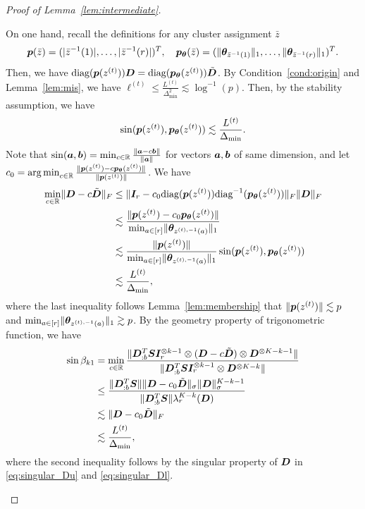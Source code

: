 \documentclass[lettersize,journal]{IEEEtran}
\theoremstyle{definition}
\theoremstyle{definition}
\begin{document}
\begin{proof}[Proof of Lemma~\ref{lem:intermediate}]
\begin{enumerate}
    On one hand, recall the definitions for any cluster assignment $\bar z$
    \begin{equation}
        \bm{p}(\bar z)=(|\bar z^{-1}(1)|, \ldots,|\bar z^{-1}(r)|)^T,\quad \bm{p}_{\boldsymbol{\theta}}(\bar z)=(\lVert\boldsymbol{\theta}_{\bar z^{-1}(1)}\rVert_1,\ldots,\lVert\boldsymbol{\theta}_{\bar z^{-1}(r)}\rVert_1)^T.
    \end{equation}
    Then, we have $\text{diag}(\bm{p}(z^{(t)})) \bm{D} = \text{diag}(\bm{p}_{\boldsymbol{\theta}}(z^{(t)})) \tilde {\bm{D}}$. By Condition~\ref{cond:origin} and Lemma~\ref{lem:mis}, we have $\ell^{(t)} \leq \frac{L^{(t)}}{\Delta_{\min}^2} \lesssim \log^{-1}(p) $. Then, by the stability assumption, we have 
    \begin{equation}
         \sin (\bm{p}(z^{(t)}), \bm{p}_{\boldsymbol{\theta}}(z^{(t)})) \lesssim \frac{L^{(t)}}{\Delta_{\min}}. 
    \end{equation}
    Note that $\sin(\bm{a},\bm{b}) =\min_{c \in \mathbb{R}} \frac{ \lVert\bm{a} - c\bm{b}\rVert }{\lVert\bm{a}\rVert}$ for vectors $\bm{a},\bm{b}$ of same dimension, and let $c_0 = \operatorname*{arg\,min}_{c \in \mathbb{R}} \frac{\lVert\bm{p}(z^{(t)}) - c\bm{p}_{\boldsymbol{\theta}}(z^{(t)})\rVert}{\lVert\bm{p}(z^{(t)})\rVert}$. We have
    \begin{align}
       \min_{c \in \mathbb{R}} \lVert \bm{D} - c \tilde {\bm{D}}\rVert_F &\leq  \lVert \bm I_r - c_0 \text{diag}(\bm{p}(z^{(t)})) \text{diag}^{-1}(\bm{p}_{\boldsymbol{\theta}}(z^{(t)}))\rVert_F \lVert\bm{D}\rVert_F\\
       &\lesssim \frac{ \lVert \bm{p}(z^{(t)}) - c_0\bm{p}_{\boldsymbol{\theta}}(z^{(t)})\rVert }{\min_{a \in [r]} \lVert\boldsymbol{\theta}_{z^{(t),-1}(a)} \rVert_1  } \\
       & \lesssim \frac{\lVert \bm{p}(z^{(t)})\rVert }{\min_{a \in [r]} \lVert\boldsymbol{\theta}_{z^{(t),-1}(a)} \rVert_1 } \sin (\bm{p}(z^{(t)}), \bm{p}_{\boldsymbol{\theta}}(z^{(t)}))\\
       & \lesssim \frac{L^{(t)}}{\Delta_{\min}},
    \end{align}
    where the last inequality follows Lemma~\ref{lem:membership} that $\lVert \bm{p}(z^{(t)})\rVert \lesssim p$ and $\min_{a \in [r]} \lVert\boldsymbol{\theta}_{z^{(t),-1}(a)} \rVert_1  \gtrsim p$. By the geometry property of trigonometric function, we have
    \begin{align}
        \sin \beta_{k1} &= \min_{c \in \mathbb{R}} \frac{\lVert\bm{D}_{:b}^{T} \bm S \bm I_r^{\otimes k-1} \otimes (\bm{D} - c \tilde {\bm{D}}) \otimes \bm{D}^{\otimes K-k - 1} \rVert }{ \lVert\bm{D}_{:b}^{T} \bm S \bm I_r^{\otimes k-1} \otimes \bm{D}^{\otimes K-k}\rVert }\\
        &\leq \frac{ \lVert\bm{D}_{:b}^{T} \bm S\rVert \lVert\bm{D} - c_0 \tilde {\bm{D}}\rVert_{\sigma} \lVert\bm{D}\rVert_{\sigma}^{K-k-1} }{\lVert\bm{D}_{:b}^{T} \bm S\rVert \lambda_r^{K-k}(\bm{D}) }\\
        & \lesssim  \lVert\bm{D} - c_0 \tilde {\bm{D}}\rVert_{F}\\
        & \lesssim \frac{L^{(t)}}{\Delta_{\min}},
    \end{align}
    where the second inequality follows by the singular property of $\bm{D}$ in \eqref{eq:singular_Du} and \eqref{eq:singular_Dl}.
    

\end{enumerate}
\end{proof}
\end{document}
